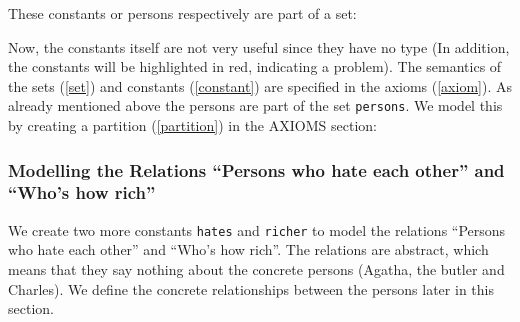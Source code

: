 These constants or persons respectively are part of a set:


Now, the constants itself are not very useful since they have no type (In addition, the constants will be highlighted in red, indicating a problem). The semantics of the sets (\ref{set}) and constants (\ref{constant}) are specified in the axioms (\ref{axiom}). As already mentioned above the persons are part of the set \texttt{persons}. We model this by creating a partition (\ref{partition}) in the \textsf{AXIOMS} section: 




\subsubsection{Modelling the Relations ``Persons who hate each other'' and ``Who's how rich''}

We create two more constants \texttt{hates} and \texttt{richer} to model the relations ``Persons who hate each other'' and ``Who's how rich''. The relations are abstract, which means that they say nothing about the concrete persons (Agatha, the butler and Charles). We define the concrete relationships between the persons later in this section.

